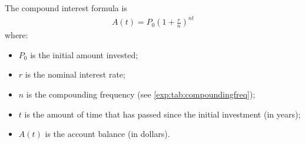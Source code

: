 \begin{pccdefinition}\label{exp:def:compoundint}
	The compound interest formula is
	\begin{align}
		A(t) = P_0\left(1+\frac{r}{n}\right)^{nt}\label{exp:form:compoundinterest} 
	\end{align}
	where:
	\begin{itemize}
		\item $P_0$ is the initial amount invested;
		\item $r$ is the nominal interest rate;
		\item $n$ is the compounding frequency (see \cref{exp:tab:compoundingfreq});
		\item $t$ is the amount of time that has passed since the initial investment (in years);
		\item $A(t)$ is the account balance (in dollars).
	\end{itemize}
\end{pccdefinition}
			
